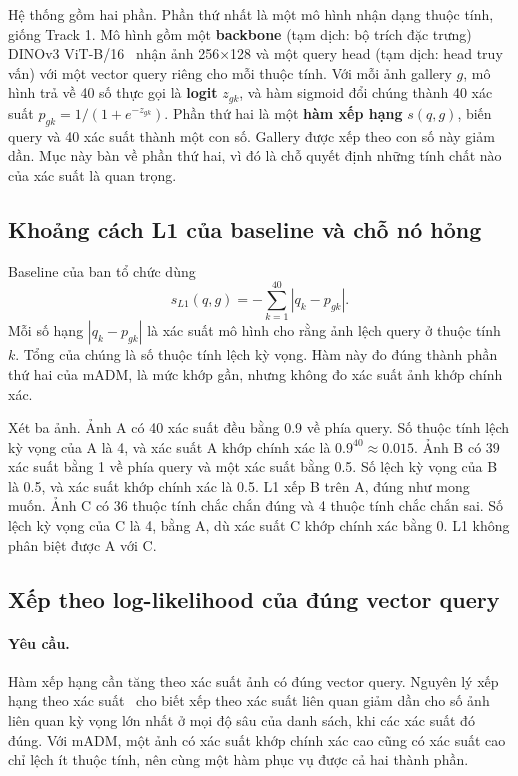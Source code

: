 \documentclass[11pt,a4paper]{article}
\begin{document}
Hệ thống gồm hai phần. Phần thứ nhất là một mô hình nhận dạng thuộc tính, giống Track 1. Mô hình gồm một \textbf{backbone} (tạm dịch: bộ trích đặc trưng) DINOv3 ViT-B/16~\cite{dinov3} nhận ảnh 256×128 và một query head (tạm dịch: head truy vấn) với một vector query riêng cho mỗi thuộc tính. Với mỗi ảnh gallery $g$, mô hình trả về 40 số thực gọi là \textbf{logit} $z_{gk}$, và hàm sigmoid đổi chúng thành 40 xác suất $p_{gk}=1/(1+e^{-z_{gk}})$. Phần thứ hai là một \textbf{hàm xếp hạng} $s(q,g)$, biến query và 40 xác suất thành một con số. Gallery được xếp theo con số này giảm dần. Mục này bàn về phần thứ hai, vì đó là chỗ quyết định những tính chất nào của xác suất là quan trọng.

\subsection{Khoảng cách L1 của baseline và chỗ nó hỏng}

Baseline của ban tổ chức dùng
\begin{equation}
s_{L1}(q,g)=-\sum_{k=1}^{40}|q_k-p_{gk}| .
\end{equation}
Mỗi số hạng $|q_k-p_{gk}|$ là xác suất mô hình cho rằng ảnh lệch query ở thuộc tính $k$. Tổng của chúng là số thuộc tính lệch kỳ vọng. Hàm này đo đúng thành phần thứ hai của mADM, là mức khớp gần, nhưng không đo xác suất ảnh khớp chính xác.

Xét ba ảnh. Ảnh A có 40 xác suất đều bằng 0.9 về phía query. Số thuộc tính lệch kỳ vọng của A là 4, và xác suất A khớp chính xác là $0.9^{40}\approx0.015$. Ảnh B có 39 xác suất bằng 1 về phía query và một xác suất bằng 0.5. Số lệch kỳ vọng của B là 0.5, và xác suất khớp chính xác là 0.5. L1 xếp B trên A, đúng như mong muốn. Ảnh C có 36 thuộc tính chắc chắn đúng và 4 thuộc tính chắc chắn sai. Số lệch kỳ vọng của C là 4, bằng A, dù xác suất C khớp chính xác bằng 0. L1 không phân biệt được A với C.

\subsection{Xếp theo log-likelihood của đúng vector query}

\paragraph{Yêu cầu.} Hàm xếp hạng cần tăng theo xác suất ảnh có đúng vector query. Nguyên lý xếp hạng theo xác suất~\cite{prp} cho biết xếp theo xác suất liên quan giảm dần cho số ảnh liên quan kỳ vọng lớn nhất ở mọi độ sâu của danh sách, khi các xác suất đó đúng. Với mADM, một ảnh có xác suất khớp chính xác cao cũng có xác suất cao chỉ lệch ít thuộc tính, nên cùng một hàm phục vụ được cả hai thành phần.
\end{document}
